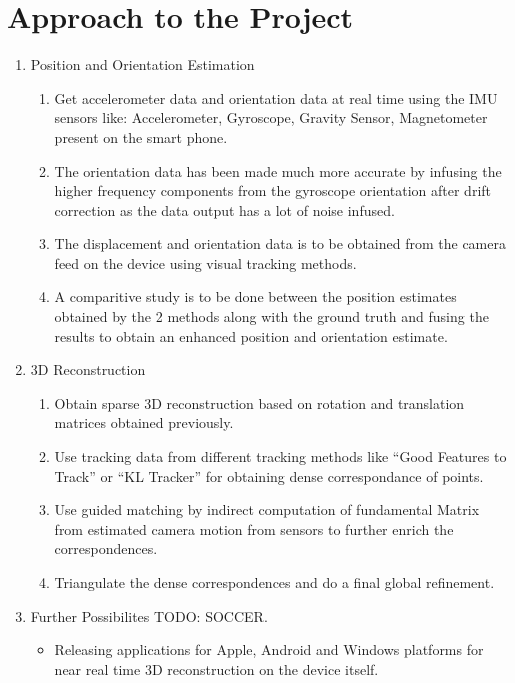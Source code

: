 \documentclass{article}
\begin{document}
	\section{Approach to the Project}
		\begin{enumerate}
			\item Position and Orientation Estimation
			\begin{enumerate}
				\item
					Get accelerometer data and orientation data at real time using the IMU sensors like: Accelerometer, Gyroscope, Gravity Sensor, Magnetometer present on the smart phone.
				\item
					The orientation data has been made much more accurate by infusing the higher frequency components from the gyroscope orientation after drift correction as the data output has a lot of noise infused.
				\item
					The displacement and orientation data is to be obtained from the camera feed on the device using visual tracking methods.
				\item
					A comparitive study is to be done between the position estimates obtained by the 2 methods along with the ground truth and fusing the results to obtain an enhanced position and orientation estimate.
			\end{enumerate}
			\item 3D Reconstruction
			\begin{enumerate}
				\item 
					Obtain sparse 3D reconstruction based on rotation and translation matrices obtained previously.
				\item
					Use tracking data from different tracking methods like ``Good Features to Track'' or ``KL Tracker'' for obtaining dense correspondance of points.
				\item
					Use guided matching by indirect computation of fundamental Matrix from estimated camera motion from sensors to further enrich the correspondences.
				\item
					Triangulate the dense correspondences and do a final global refinement.					
			\end{enumerate}
			\item Further Possibilites TODO: SOCCER.
			\begin{itemize}
				\item Releasing applications for Apple, Android and Windows platforms for near real time 3D reconstruction on the device itself.
			\end{itemize}


\end{enumerate}
\end{document}
